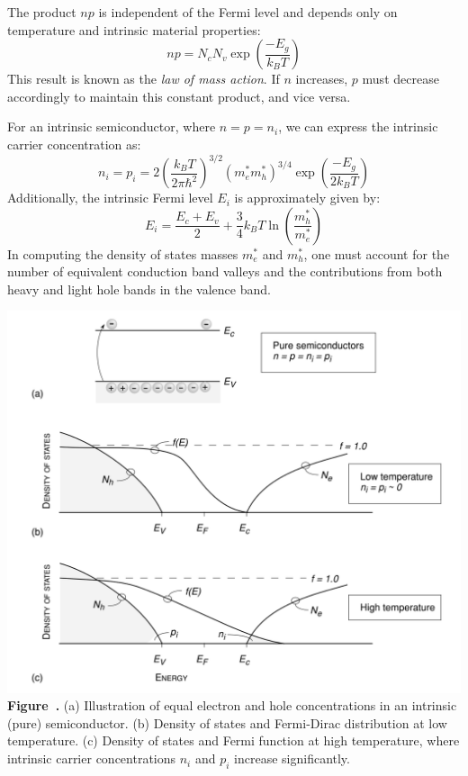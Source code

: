 The product \( np \) is independent of the Fermi level and depends only on temperature and intrinsic material properties:
\begin{equation}
	np = N_c N_v \exp \left( \frac{-E_g}{k_B T} \right)
\end{equation}
\noindent
This result is known as the \textit{law of mass action}. If \( n \) increases, \( p \) must decrease accordingly to maintain this constant product, and vice versa.

For an intrinsic semiconductor, where \( n = p = n_i \), we can express the intrinsic carrier concentration as:
\begin{equation}
	n_i = p_i = 2 \left( \frac{k_B T}{2\pi \hbar^2} \right)^{3/2} \left( m_e^* m_h^* \right)^{3/4} \exp \left( \frac{-E_g}{2k_B T} \right)
\end{equation}
Additionally, the intrinsic Fermi level \( E_i \) is approximately given by:
\begin{equation}
	E_i = \frac{E_c + E_v}{2} + \frac{3}{4} k_B T \ln \left( \frac{m_h^*}{m_e^*} \right)
\end{equation}
In computing the density of states masses \( m_e^* \) and \( m_h^* \), one must account for the number of equivalent conduction band valleys and the contributions from both heavy and light hole bands in the valence band.
\begin{center}
	\begin{minipage}{0.9\textwidth}
		\centering
		\includegraphics[width=\textwidth]{img/hole_denisties&Fermi_occupation.png}
		\\[0.5em]
		\textbf{Figure~\thefigure.}
		(a) Illustration of equal electron and hole concentrations in an intrinsic (pure) semiconductor.
		(b) Density of states and Fermi-Dirac distribution at low temperature.
		(c) Density of states and Fermi function at high temperature, where intrinsic carrier concentrations $n_i$ and $p_i$ increase significantly.
		\label{fig:hole_denisties&Fermi_occupation}
	\end{minipage}
\end{center}

